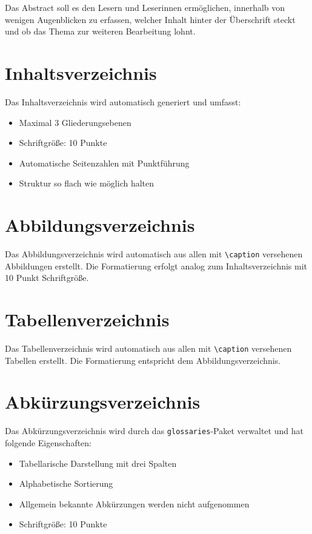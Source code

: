 Das Abstract soll es den Lesern und Leserinnen ermöglichen, innerhalb von wenigen Augenblicken zu erfassen, welcher Inhalt hinter der Überschrift steckt und ob das Thema zur weiteren Bearbeitung lohnt.

\section{Inhaltsverzeichnis}
\label{sec:inhaltsverzeichnis_format}

Das Inhaltsverzeichnis wird automatisch generiert und umfasst:
\begin{itemize}
	\item Maximal 3 Gliederungsebenen
	\item Schriftgröße: 10 Punkte
	\item Automatische Seitenzahlen mit Punktführung
	\item Struktur so flach wie möglich halten
\end{itemize}

\section{Abbildungsverzeichnis}
\label{sec:abbildungsverzeichnis}

Das Abbildungsverzeichnis wird automatisch aus allen mit \texttt{\textbackslash caption} versehenen Abbildungen erstellt. Die Formatierung erfolgt analog zum Inhaltsverzeichnis mit 10 Punkt Schriftgröße.

\section{Tabellenverzeichnis}
\label{sec:tabellenverzeichnis}

Das Tabellenverzeichnis wird automatisch aus allen mit \texttt{\textbackslash caption} versehenen Tabellen erstellt. Die Formatierung entspricht dem Abbildungsverzeichnis.

\section{Abkürzungsverzeichnis}
\label{sec:abkuerzungsverzeichnis}

Das Abkürzungsverzeichnis wird durch das \texttt{glossaries}-Paket verwaltet und hat folgende Eigenschaften:
\begin{itemize}
	\item Tabellarische Darstellung mit drei Spalten
	\item Alphabetische Sortierung
	\item Allgemein bekannte Abkürzungen werden nicht aufgenommen
	\item Schriftgröße: 10 Punkte
\end{itemize}

